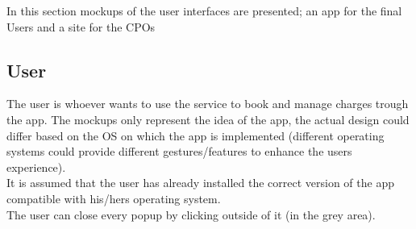 In this section mockups of the user interfaces are presented; an app for the final Users and a site for the \acp{CPO}
\subsection{User}
The user is whoever wants to use the service to book and manage charges trough the app. The mockups only represent the idea of the app, the actual design could differ based on the OS on which the app is implemented (different operating systems could provide different gestures/features to enhance the users experience).\\
It is assumed that the user has already installed the correct version of the app compatible with his/hers operating system.\\
The user can close every popup by clicking outside of it (in the grey area).
